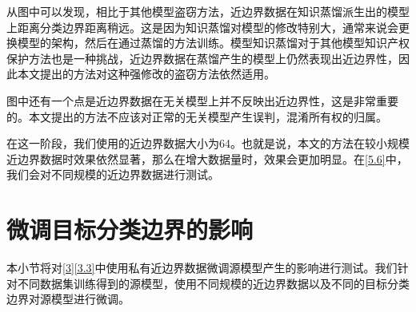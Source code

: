 从图中可以发现，相比于其他模型盗窃方法，近边界数据在知识蒸馏派生出的模型上距离分类边界距离稍远。这是因为知识蒸馏对模型的修改特别大，通常来说会更换模型的架构，然后在通过蒸馏的方法训练。模型知识蒸馏对于其他模型知识产权保护方法也是一种挑战，近边界数据在蒸馏产生的模型上仍然表现出近边界性，因此本文提出的方法对这种强修改的盗窃方法依然适用。

图中还有一个点是近边界数据在无关模型上并不反映出近边界性，这是非常重要的。本文提出的方法不应该对正常的无关模型产生误判，混淆所有权的归属。

在这一阶段，我们使用的近边界数据大小为64。也就是说，本文的方法在较小规模近边界数据时效果依然显著，那么在增大数据量时，效果会更加明显。在\ref{5.6}中，我们会对不同规模的近边界数据进行测试。

\section{微调目标分类边界的影响}\label{5.4}

本小节将对\ref{3}\ref{3.3}中使用私有近边界数据微调源模型产生的影响进行测试。我们针对不同数据集训练得到的源模型，使用不同规模的近边界数据以及不同的目标分类边界对源模型进行微调。

